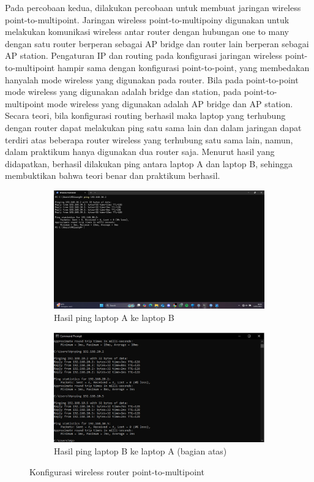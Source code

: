 Pada percobaan kedua, dilakukan percobaan untuk membuat jaringan wireless point-to-multipoint. Jaringan wireless point-to-multipoiny digunakan untuk melakukan komunikasi wireless antar router dengan hubungan one to many dengan satu router berperan sebagai AP bridge dan router lain berperan sebagai AP station. Pengaturan IP dan routing pada konfigurasi jaringan wireless point-to-multipoint hampir sama dengan konfigurasi point-to-point, yang membedakan hanyalah mode wireless yang digunakan pada router. Bila pada point-to-point mode wireless yang digunakan adalah bridge dan station, pada point-to-multipoint mode wireless yang digunakan adalah AP bridge dan AP station. Secara teori, bila konfigurasi routing berhasil maka laptop yang terhubung dengan router dapat melakukan ping satu sama lain dan dalam jaringan dapat terdiri atas beberapa router wireless yang terhubung satu sama lain, namun, dalam praktikum hanya digunakan dua router saja. Menurut hasil yang didapatkan, berhasil dilakukan ping antara laptop A dan laptop B, sehingga membuktikan bahwa teori benar dan praktikum berhasil.
\begin{figure}[H]
	\centering
	\begin{subfigure}[b]{0.4\linewidth}
		\centering
		\includegraphics[width=\linewidth]{P3/img/pmp ping a.jpg}
		\caption{Hasil ping laptop A ke laptop B\label{fig:konfigurasiR1}}
	\end{subfigure}
	\begin{subfigure}[b]{0.4\linewidth}
		\centering
		\includegraphics[width=\linewidth]{P3/img/ptp wb ping b.jpg}
		\caption{Hasil ping laptop B ke laptop A (bagian atas)\label{fig:konfigurasiR2}}
	\end{subfigure}
	\caption{Konfigurasi wireless router point-to-multipoint}
	\hspace{1cm}
\end{figure}


